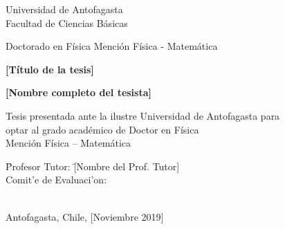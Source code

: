 \documentclass[lettersize,12pt]{report}
\begin{document}
\vspace*{3mm}
\begin{center}
 \begin{large}
 	{\Large Universidad de Antofagasta}\\
 	Facultad de Ciencias B\'asicas
 	
 	\vspace*{10mm}
 	Doctorado en F\'isica Menci\'on F\'isica - Matem\'atica
 	
 	\vspace*{40mm}
 	{\bf \LARGE [T\'itulo de la tesis] }
 	
 	\vspace*{10mm}
 	{\bf [Nombre completo del tesista] }
 	
 	\vspace*{15mm}
 	
 	Tesis presentada ante la ilustre Universidad de Antofagasta para\\ optar al grado acad\'emico de Doctor en F\'isica\\ Menci\'on F\'isica -- Matem\'atica
 	
 \end{large}
\end{center}

\begin{large}
\vspace*{15mm}
\begin{tabbing}
\= Profesor Tutor: 
\hspace{15mm} 
                      \= [Nombre del Prof. Tutor] \\[10mm]
\> Comit\a'e de Evaluaci\a'on: \\
	\>                       \\
	\>                       
\end{tabbing}

\vspace*{25mm}
\begin{center}
	Antofagasta, Chile, [Noviembre 2019]
\end{center}
\end{large}

\end{document}
